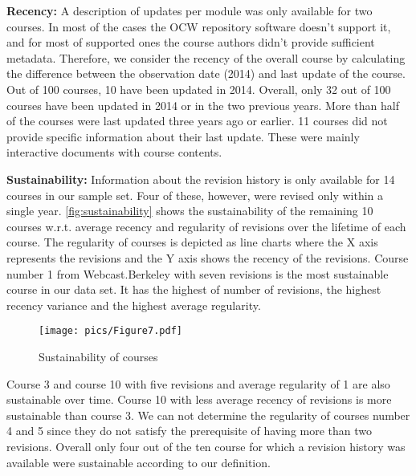 \documentclass{sig-alternate}
\theoremstyle{definition}
\begin{document}
\noindent\textbf{Recency:}
A description of updates per module was only available for two courses.
In most of the cases the OCW repository software doesn't support it, and for most of supported ones the course authors didn't provide sufficient metadata.
Therefore, we consider the recency of the overall course by calculating the difference between the observation date (2014) and last update of the course.
Out of 100 courses, 10 have been updated in 2014.
Overall, only 32 out of 100 courses have been updated in 2014 or in the two previous years.
More than half of the courses were last updated three years ago or earlier.
11 courses did not provide specific information about their last update.
These were mainly interactive documents with course contents. 

\noindent\textbf{Sustainability:}
Information about the revision history is only available for 14 courses in our sample set.
Four of these, however, were revised only within a single year.
\autoref{fig:sustainability} shows the sustainability of the remaining 10 courses w.r.t. average recency and regularity of revisions over the lifetime of each course.
The regularity of courses is depicted as line charts where the X axis represents the revisions and the Y axis shows the recency of the revisions.
Course number 1 from Webcast.Berkeley with seven revisions is the most sustainable course in our data set.
It has the highest of number of revisions, the highest recency variance and the highest average regularity.

\begin{figure}[h]
\texttt{[image: pics/Figure7.pdf]}
\caption{Sustainability of courses}
\label{fig:sustainability}
\end{figure}

Course 3 and course 10 with five revisions and average regularity of 1 are also sustainable over time.
Course 10 with less average recency of revisions is more sustainable than course 3.
We can not determine the regularity of courses number 4 and 5 since they do not satisfy the prerequisite of having more than two revisions.
Overall only four out of the ten course for which a revision history was available were sustainable according to our definition.
\end{document}
